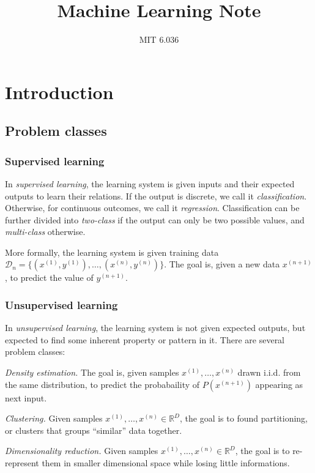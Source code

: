 \documentclass[12pt,a4paper,twoside]{article}
\title{Machine Learning \textbf{Note}}
\author{MIT 6.036}
\date{}
\theoremstyle{definition}
\theoremstyle{remark}
\begin{document}
  	\maketitle
  	\section{Introduction}
  	\subsection{Problem classes}
    \subsubsection{Supervised learning}
    In \textit{supervised learning}, the learning system is given inputs and their expected outputs to learn their relations. If the output is discrete, we call it \textit{classification}. Otherwise, for continuous outcomes, we call it \textit{regression}. Classification can be further divided into \textit{two-class} if the output can only be two possible values, and \textit{multi-class} otherwise.

    More formally, the learning system is given training data $\mathcal D_n = \{(x^{(1)}, y^{(1)}), \ldots, (x^{(n)}, y^{(n)})\}$. The goal is, given a new data $x^{(n + 1)}$, to predict the value of $y^{(n + 1)}$.
    
    \subsubsection{Unsupervised learning}
    In \textit{unsupervised learning}, the learning system is not given expected outputs, but expected to find 
    some inherent property or pattern in it. There are several problem classes:

    \textit{Density estimation.} The goal is, given samples $x^{(1)}, \ldots, x^{(n)}$ drawn i.i.d. from the same distribution, to predict the probabaility of $P(x^{(n + 1)})$ appearing as next input.

    \textit{Clustering.} Given samples $x^{(1)}, \ldots, x^{(n)} \in \mathbb R^D$, the goal is to found partitioning, or clusters that groups ``similar'' data together.

    \textit{Dimensionality reduction.} Given samples $x^{(1)}, \ldots, x^{(n)} \in \mathbb R^D$, the goal is to re-represent them in smaller dimensional space while losing little informations.
\end{document}
